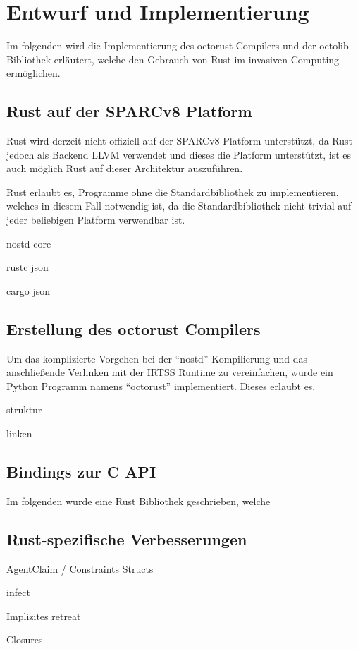 \chapter{Entwurf und Implementierung}\label{sec:impl}

Im folgenden wird die Implementierung des octorust Compilers und der octolib Bibliothek erläutert, welche
den Gebrauch von Rust im invasiven Computing ermöglichen.

\section{Rust auf der SPARCv8 Platform}

Rust wird derzeit nicht offiziell auf der SPARCv8 Platform unterstützt, da Rust jedoch als Backend LLVM verwendet und dieses
die Platform unterstützt, ist es auch möglich Rust auf dieser Architektur auszuführen.

Rust erlaubt es, Programme ohne die Standardbibliothek zu implementieren, welches in diesem Fall notwendig ist, da die
Standardbibliothek nicht trivial auf jeder beliebigen Platform verwendbar ist. 

nostd core

rustc json

cargo json

\section{Erstellung des octorust Compilers}

Um das komplizierte Vorgehen bei der ``nostd'' Kompilierung und das anschließende Verlinken mit der IRTSS Runtime zu
vereinfachen, wurde ein Python Programm namens ``octorust'' implementiert. Dieses erlaubt es,

struktur

linken

\section{Bindings zur C API}

Im folgenden wurde eine Rust Bibliothek geschrieben, welche

\section{Rust-spezifische Verbesserungen}

AgentClaim / Constraints Structs

infect

Implizites retreat

Closures

